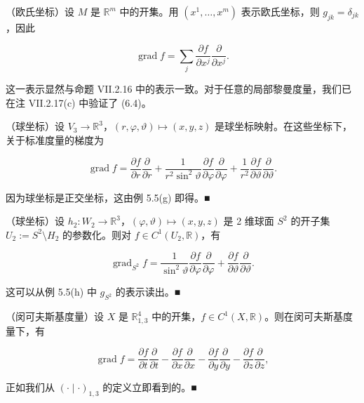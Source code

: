 \begin{example}

\begin{items}
\item

（欧氏坐标）设 $ M $ 是 $ \mathbb{R}^{m} $ 中的开集。用 $ (x^{1}, \dots, x^{m}) $ 表示欧氏坐标，则 $ g_{jk} = \delta_{jk} $，因此

\[
\operatorname{grad} f = \sum_{j}\frac{\partial f}{\partial x^{j}}\frac{\partial}{\partial x^{j}}.
\]

这一表示显然与命题 VII.2.16 中的表示一致。对于任意的局部黎曼度量，我们已在注 VII.2.17(c) 中验证了 (6.4)。

\item

（球坐标）设 $ V_{3} \to \mathbb{R}^{3} $，$ (r, \varphi, \vartheta) \mapsto (x, y, z) $ 是球坐标映射。在这些坐标下，关于标准度量的梯度为

\[
\operatorname{grad} f = \frac{\partial f}{\partial r}\frac{\partial}{\partial r} + \frac{1}{r^{2}\sin^{2}\vartheta}\frac{\partial f}{\partial \varphi}\frac{\partial}{\partial \varphi} + \frac{1}{r^{2}}\frac{\partial f}{\partial \vartheta}\frac{\partial}{\partial \vartheta}.
\]

\proofhead
因为球坐标是正交坐标，这由例 5.5(g) 即得。\nobreak\hspace{0.35em}■
\item

（球坐标）设 $ h_2: W_2 \to \mathbb{R}^3 $，$ (\varphi,\vartheta) \mapsto (x,y,z) $ 是 2 维球面 $ S^2 $ 的开子集 $ U_2 := S^2\setminus H_2 $ 的参数化。则对 $ f \in C^1(U_2,\mathbb{R}) $，有

\[
\operatorname{grad}_{S^2} f = \frac{1}{\sin^2\vartheta}\frac{\partial f}{\partial\varphi}\frac{\partial}{\partial\varphi} + \frac{\partial f}{\partial\vartheta}\frac{\partial}{\partial\vartheta}.
\]

\proofhead
这可以从例 5.5(h) 中 $ g_{S^2} $ 的表示读出。\nobreak\hspace{0.35em}■
\item

（闵可夫斯基度量）设 $ X $ 是 $ \mathbb{R}^4_{1,3} $ 中的开集，$ f \in C^1(X,\mathbb{R}) $。则在闵可夫斯基度量下，有

\[
\operatorname{grad} f = \frac{\partial f}{\partial t}\frac{\partial}{\partial t} - \frac{\partial f}{\partial x}\frac{\partial}{\partial x} - \frac{\partial f}{\partial y}\frac{\partial}{\partial y} - \frac{\partial f}{\partial z}\frac{\partial}{\partial z},
\]

正如我们从 $ (\cdot\mid\cdot)_{1,3} $ 的定义立即看到的。\nobreak\hspace{0.35em}■

\end{items}

\end{example}

